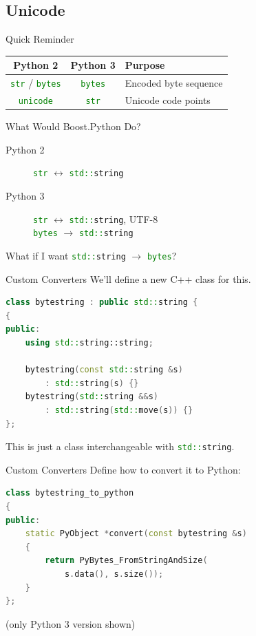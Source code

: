 \documentclass{beamer}
\def\linlinep{\lstinline[basicstyle=\ttfamily,language=python]}
\def\linlinec{\lstinline[basicstyle=\ttfamily,language=c++]}
\begin{document}
\subsection{Unicode}

\begin{frame}{Quick Reminder}
  \centering
  \begin{tabular}{ccl}
    \toprule
    \textbf{Python 2} & \textbf{Python 3} & \textbf{Purpose}\\
    \midrule
    \linlinep"str" / \linlinep"bytes" & \linlinep"bytes" & Encoded byte sequence\\
    \linlinep"unicode" & \linlinep"str" & Unicode code points\\
    \bottomrule
  \end{tabular}
\end{frame}

\begin{frame}{What Would Boost.Python Do?}
  \begin{description}
    \item[Python 2] \linlinep"str" $\leftrightarrow$ \linlinec"std::string"
    \item[Python 3] \linlinep"str" $\leftrightarrow$ \linlinec"std::string", UTF-8\\
                    \linlinep"bytes" $\rightarrow$ \linlinec"std::string"
  \end{description}
  \pause
  What if I want \linlinec"std::string" $\rightarrow$ \linlinep"bytes"?
\end{frame}

\begin{frame}[fragile=singleslide]{Custom Converters}
We'll define a new C++ class for this.
  \begin{lstlisting}[language=c++]
class bytestring : public std::string {
{
public:
    using std::string::string;

    bytestring(const std::string &s)
        : std::string(s) {}
    bytestring(std::string &&s)
        : std::string(std::move(s)) {}
};
  \end{lstlisting}

This is just a class interchangeable with \linlinec"std::string".
\end{frame}

\begin{frame}[fragile=singleslide]{Custom Converters}
  Define how to convert it to Python:
  \begin{lstlisting}[language=c++]
class bytestring_to_python
{
public:
    static PyObject *convert(const bytestring &s)
    {
        return PyBytes_FromStringAndSize(
            s.data(), s.size());
    }
};
  \end{lstlisting}
  {\footnotesize (only Python 3 version shown)}
\end{frame}
\end{document}
